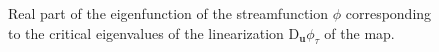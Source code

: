 \begin{figure}[t]
\centering
{}
\hspace{8pt}
\hspace{8pt}
\caption{Real part of the eigenfunction of the streamfunction $\phi$  corresponding to the critical eigenvalues of the linearization $\mathrm{D}_{\mathbf{u}}\phi_{\tau}$ of the map.
\label{eigenfuntion}}
\end{figure}

